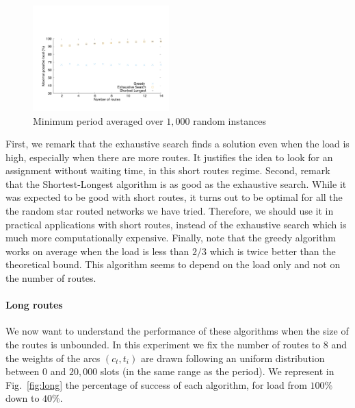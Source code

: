 \documentclass[10pt, conference, letterpaper]{IEEEtran}
\begin{document}
        
      \begin{figure}[h]
      \begin{center}
	 \includegraphics[width=0.47\textwidth]{periode_petite.pdf}
      \end{center}
      \caption{Minimum period averaged over $1,000$ random instances}\label{fig:short}
      \end{figure}
      First, we remark that the exhaustive search finds a solution even when the load is high, especially when there are more routes.
      It justifies the idea to look for an assignment without waiting time, in this short routes regime.
      Second, remark that the Shortest-Longest algorithm is as good as the exhaustive search. While it was expected to be good with short routes, it turns out to be optimal for all the the random star routed networks we have tried. Therefore, we should use it in practical applications with short routes, instead of the exhaustive search which is much more computationally expensive. 
      Finally, note that the greedy algorithm works on average when the load is less than $2/3$ which is twice better than the theoretical bound. This algorithm seems to depend on the load only and not on the number of routes.
      
        \paragraph{Long routes}
      
      We now want to understand the performance of these algorithms when the size of the routes is unbounded. In this experiment we fix the number of routes to $8$ and the weights of the arcs $(c_t,t_i)$ are drawn following an uniform distribution between $0$ and $20,000$ slots (in the same range as the period). We represent in Fig.~\ref{fig:long} the percentage of success of each algorithm, for load from $100\%$ down to $40\%$.
      
\end{document}
